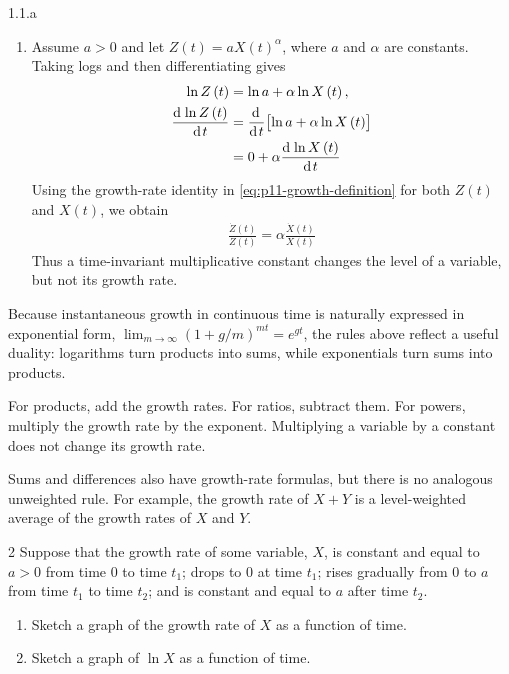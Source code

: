 \begin{solution}{1.1.a}
\begin{enumerate}[label=(\alph*)]
    \item Assume \(a>0\) and let \(Z\left(t\right)=aX\left(t\right)^\alpha\), where \(a\) and
    \(\alpha\) are constants. Taking logs and then differentiating gives
    \begin{align*}
        \operatorname{ln} Z\left(t\right)&=\operatorname{ln} a+\alpha\operatorname{ln} X\left(t\right),\\
        \frac{\mathrm{d}\mspace{2mu}\operatorname{ln} Z\left(t\right)}{\mathrm{d}\mspace{2mu} t}
        &=\frac{\mathrm{d}\mspace{2mu}}{\mathrm{d}\mspace{2mu} t}\bigl[\operatorname{ln} a+\alpha\operatorname{ln} X\left(t\right)\bigr]\\
        &=0+\alpha\frac{\mathrm{d}\mspace{2mu}\operatorname{ln} X\left(t\right)}{\mathrm{d}\mspace{2mu} t}
    \end{align*}
    Using the growth-rate identity in \eqref{eq:p11-growth-definition} for
    both \(Z\left(t\right)\) and \(X\left(t\right)\), we obtain
    \begin{align*}
        \boxed{
        \frac{\dot Z\left(t\right)}{Z\left(t\right)}
        =\alpha\frac{\dot X\left(t\right)}{X\left(t\right)}}
    \end{align*}
    Thus a time-invariant multiplicative constant changes the level of a variable,
    but not its growth rate.
\end{enumerate}
\end{solution}

\begin{note}
    Because instantaneous growth in continuous time is naturally expressed in exponential
    form, \(\lim_{m\to\infty}(1+g/m)^{mt}=e^{gt}\), the rules above reflect a useful
    duality: logarithms turn products into sums, while exponentials turn sums into products.
\end{note}

\begin{note}
    For products, add the growth rates. For ratios, subtract them. For powers,
    multiply the growth rate by the exponent. Multiplying a variable by a constant
    does not change its growth rate.
\end{note}

\begin{note}
    Sums and differences also have growth-rate formulas, but there is no analogous
    unweighted rule. For example, the growth rate of \(X+Y\) is a level-weighted
    average of the growth rates of \(X\) and \(Y\).
\end{note}

\begin{problem}{2}
Suppose that the growth rate of some variable, \(X\), is constant and equal to \(a>0\) from time 0
to time \(t_1\); drops to 0 at time \(t_1\); rises gradually from 0 to \(a\) from time \(t_1\)
to time \(t_2\); and is constant and equal to \(a\) after time \(t_2\).
\begin{enumerate}[label=(\alph*)]
    \item Sketch a graph of the growth rate of \(X\) as a function of time.
    \item Sketch a graph of \(\ln X\) as a function of time.
\end{enumerate}
\end{problem}

